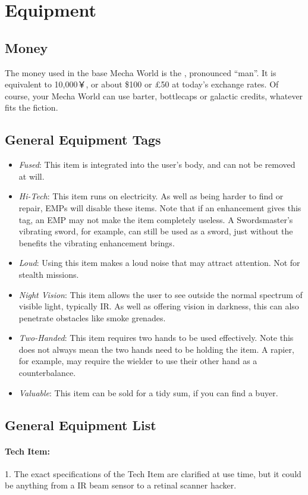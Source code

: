 \section{Equipment}
\subsection{Money}
The money used in the base Mecha World is the \money, pronounced ``man''. It is equivalent to 10,000￥, or about \$100 or £50 at today's exchange rates. Of course, your Mecha World can use barter, bottlecaps or galactic credits, whatever fits the fiction.

\subsection{General Equipment Tags}
\begin{itemize}
\item \textit{Fused}: This item is integrated into the user's body, and can not be removed at will.
\item \textit{Hi-Tech}: This item runs on electricity. As well as being harder to find or repair, EMPs will disable these items. Note that if an enhancement gives this tag, an EMP may not make the item completely useless. A Swordsmaster's vibrating sword, for example, can still be used as a sword, just without the benefits the vibrating enhancement brings.
\item \textit{Loud}: Using this item makes a loud noise that may attract attention. Not for stealth missions.
\item \textit{Night Vision}: This item allows the user to see outside the normal spectrum of visible light, typically IR. As well as offering vision in darkness, this can also penetrate obstacles like smoke grenades. 
\item \textit{Two-Handed}: This item requires two hands to be used effectively. Note this does not always mean the two hands need to be holding the item. A rapier, for example, may require the wielder to use their other hand as a counterbalance. 
\item \textit{Valuable}: This item can be sold for a tidy sum, if you can find a buyer.
\end{itemize}

\subsection{General Equipment List}
\paragraph{Tech Item:} 1\money. The exact specifications of the Tech Item are clarified at use time, but it could be anything from a IR beam sensor to a retinal scanner hacker.
